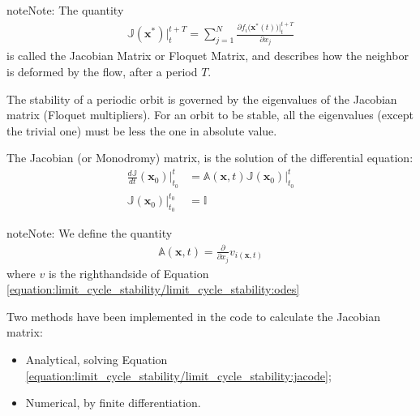 \documentclass[letterpaper,10pt,english,openany,oneside]{sphinxmanual}
\begin{document}
\begin{sphinxadmonition}{note}{Note:}
The quantity
\begin{equation*}
\begin{split}\mathbb{J}(\mathbf{x}^*)\big \rvert_{t}^{t+T}= \sum_{j = 1}^{N} \frac{\partial f_{i}\big(\textbf{x}^*(t)\big) \big \rvert_{t}^{t+T}}{\partial x_{j}}\end{split}
\end{equation*}
is called the Jacobian Matrix or Floquet Matrix, and describes how the neighbor is deformed by the flow, after a period \(T\).
\end{sphinxadmonition}

The stability of a periodic orbit is governed by the eigenvalues of the Jacobian matrix (Floquet multipliers). For an orbit to be stable, all the eigenvalues (except the trivial one) must be less the one in absolute value.

The Jacobian (or Monodromy) matrix, is the solution of the differential equation:
\begin{equation}\label{equation:limit_cycle_stability/limit_cycle_stability:jacode}
\begin{split}\frac{d\mathbb{J}}{dt}(\mathbf{x}_0) \Big \rvert_{t_0}^{t}&= \mathbb{A}(\mathbf{x}, t) \mathbb{J}(\mathbf{x}_0) \Big \rvert_{t_0}^{t}\\
\mathbb{J} (\mathbf{x}_0)\Big \rvert_{t_0}^{t_0} &= \mathbb{I}\end{split}
\end{equation}
\begin{sphinxadmonition}{note}{Note:}
We define  the quantity
\begin{equation*}
\begin{split}\mathbb{A}(\mathbf{x}, t) = \frac{\partial}{\partial x_j}v_{i(\mathbf{x}, t)}\end{split}
\end{equation*}
where \(v\) is the right\sphinxhyphen{}hand\sphinxhyphen{}side of Equation \eqref{equation:limit_cycle_stability/limit_cycle_stability:odes}
\end{sphinxadmonition}

Two methods have been implemented in the code to calculate the Jacobian matrix:
\begin{itemize}
\item {} 
Analytical, solving Equation \eqref{equation:limit_cycle_stability/limit_cycle_stability:jacode};

\item {} 
Numerical, by finite differentiation.

\end{itemize}
\end{document}
